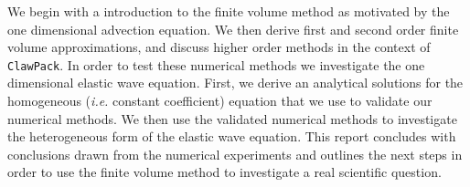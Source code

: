 \documentclass[review,onefignum,onetabnum]{siamart171218}
\begin{document}
We begin with a introduction to the finite volume method as motivated by the one dimensional advection equation. We then derive first and second order finite volume approximations, and discuss higher order methods in the context of \texttt{ClawPack}. In order to test these numerical methods we investigate the one dimensional elastic wave equation. First, we derive an analytical solutions for the homogeneous (\textit{i.e.} constant coefficient) equation that we use to validate our numerical methods. We then use the validated numerical methods to investigate the heterogeneous form of the elastic wave equation. This report concludes with conclusions drawn from the numerical experiments and outlines the next steps in order to use the finite volume method to investigate a real scientific question. 

\end{document}
